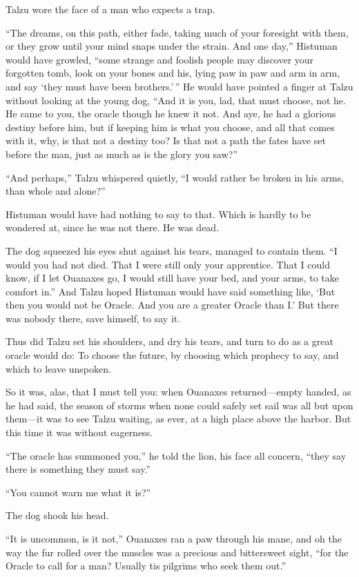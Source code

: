Talzu wore the face of a man who expects a trap.

``The dreams, on this path, either fade, taking much of your foresight with them, or they grow until your mind snaps under the strain. And one day,'' Histuman would have growled, ``some strange and foolish people may discover your forgotten tomb, look on your bones and his, lying paw in paw and arm in arm, and say `they must have been brothers.'\,'' He would have pointed a finger at Talzu without looking at the young dog, ``And it is you, lad, that must choose, not he. He came to you, the oracle though he knew it not. And aye, he had a glorious destiny before him, but if keeping him is what you choose, and all that comes with it, why, is that not a destiny too? Is that not a path the fates have set before the man, just as much as is the glory you saw?''

``And perhaps,'' Talzu whispered quietly, ``I would rather be broken in his arms, than whole and alone?''

Histuman would have had nothing to say to that. Which is hardly to be wondered at, since he was not there. He was dead.

The dog squeezed his eyes shut against his tears, managed to contain them. ``I would you had not died. That I were still only your apprentice. That I could know, if I let Ouanaxes go, I would still have your bed, and your arms, to take comfort in.'' And Talzu hoped Histuman would have said something like, `But then you would not be Oracle. And you are a greater Oracle than I.' But there was nobody there, save himself, to say it.

Thus did Talzu set his shoulders, and dry his tears, and turn to do as a great oracle would do: To choose the future, by choosing which prophecy to say, and which to leave unspoken.

\secdiv

So it was, alas, that I must tell you: when Ouanaxes returned---empty handed, as he had said, the season of storms when none could safely set sail was all but upon them---it was to see Talzu waiting, as ever, at a high place above the harbor. But this time it was without eagerness.

``The oracle has summoned you,'' he told the lion, his face all concern, ``they say there is something they must say.''

``You cannot warn me what it is?''

The dog shook his head.

``It is uncommon, is it not,'' Ouanaxes ran a paw through his mane, and oh the way the fur rolled over the muscles was a precious and bittersweet sight, ``for the Oracle to call for a man? Usually tis pilgrims who seek them out.''

